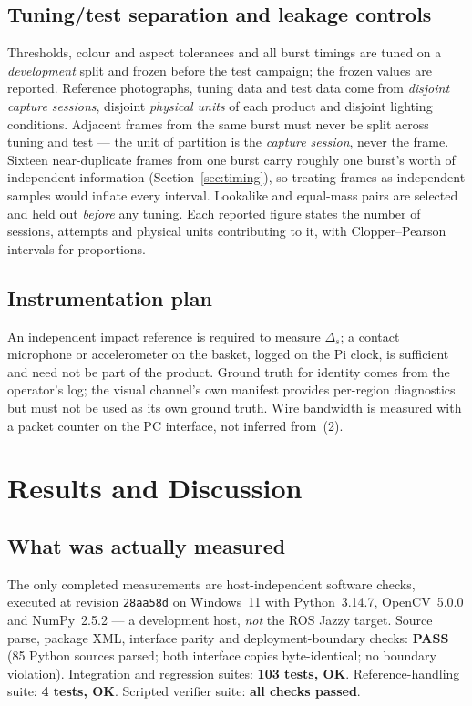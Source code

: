 \documentclass[conference]{IEEEtran}
\begin{document}
\subsection{Tuning/test separation and leakage controls}
Thresholds, colour and aspect tolerances and all burst timings are tuned on a \emph{development}
split and frozen before the test campaign; the frozen values are reported. Reference photographs,
tuning data and test data come from \emph{disjoint capture sessions}, disjoint \emph{physical units}
of each product and disjoint lighting conditions. Adjacent frames from the same burst must never be
split across tuning and test --- the unit of partition is the \emph{capture session}, never the frame.
Sixteen near-duplicate frames from one burst carry roughly one burst's worth of independent
information (Section~\ref{sec:timing}), so treating frames as independent samples would inflate every
interval. Lookalike and equal-mass pairs are selected and held out \emph{before} any tuning. Each
reported figure states the number of sessions, attempts and physical units contributing to it, with
Clopper--Pearson intervals for proportions.

\subsection{Instrumentation plan}
An independent impact reference is required to measure $\Delta_s$; a contact microphone or
accelerometer on the basket, logged on the Pi clock, is sufficient and need not be part of the
product. Ground truth for identity comes from the operator's log; the visual channel's own manifest
provides per-region diagnostics but must not be used as its own ground truth. Wire bandwidth is
measured with a packet counter on the PC interface, not inferred from~(2).

\section{Results and Discussion}
\label{sec:results}

\subsection{What was actually measured}
The only completed measurements are host-independent software checks, executed at revision
\texttt{28aa58d} on Windows~11 with Python~3.14.7, OpenCV~5.0.0 and NumPy~2.5.2 --- a development
host, \emph{not} the ROS Jazzy target. Source parse, package XML, interface parity and
deployment-boundary checks: \textbf{PASS} (85 Python sources parsed; both interface copies
byte-identical; no boundary violation). Integration and regression suites: \textbf{103 tests, OK}.
Reference-handling suite: \textbf{4 tests, OK}. Scripted verifier suite: \textbf{all checks passed}.
\end{document}
